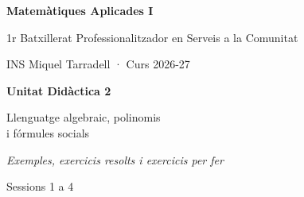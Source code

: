 \documentclass[11pt,a4paper]{article}
\begin{document}
\begin{titlepage}
\centering
\vspace*{3cm}
{\Large\bfseries\color{udnavy} Matemàtiques Aplicades I\par}
\vspace{0.4cm}
{\large 1r Batxillerat Professionalitzador en Serveis a la Comunitat\par}
\vspace{0.2cm}
{\large INS Miquel Tarradell · Curs 2026-27\par}
\vspace{2cm}
{\Huge\bfseries\color{udnavy} Unitat Didàctica 2\par}
\vspace{0.4cm}
{\LARGE Llenguatge algebraic, polinomis\\ i fórmules socials\par}
\vspace{1.5cm}
{\large\itshape Exemples, exercicis resolts i exercicis per fer\par}
{\large Sessions 1 a 4\par}
\vfill
\end{titlepage}

\tableofcontents
\newpage


\newpage

\newpage

\newpage

\end{document}
